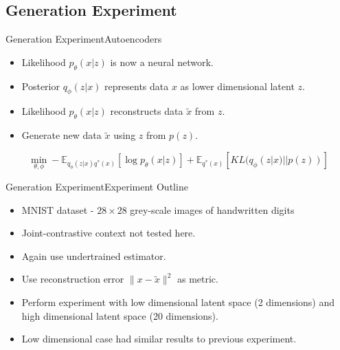 \documentclass{beamer}
\begin{document}
\subsection{Generation Experiment}
\begin{frame}{Generation Experiment}{Autoencoders}
\begin{itemize}
\item Likelihood $p_\theta(x|z)$ is now a neural network.
\item Posterior $q_\phi(z|x)$ represents data $x$ as lower dimensional latent $z$.
\item Likelihood $p_\theta(x|z)$ reconstructs data $\tilde{x}$ from $z$.
\item Generate new data $\tilde{x}$ using $z$ from $p(z)$.
\end{itemize}
\begin{figure}[h]
  \centering
\end{figure}
\[\min_{\theta, \phi} -\mathbb{E}_{q_\phi(z|x)q^*(x)}[\log p_\theta(x|z)]+\mathbb{E}_{q^*(x)}[KL(q_\phi(z|x)||p(z))]\]
\end{frame}
\begin{frame}{Generation Experiment}{Experiment Outline}
\begin{itemize}
\item MNIST dataset - $28\times 28$ grey-scale images of handwritten digits
\item Joint-contrastive context not tested here.
\item Again use undertrained estimator.
\item Use reconstruction error $\|x-\tilde{x}\|^2$ as metric.
\item Perform experiment with low dimensional latent space (2 dimensions) and high dimensional latent space (20 dimensions).
\item Low dimensional case had similar results to previous experiment.
\end{itemize}
\end{frame}
\end{document}
